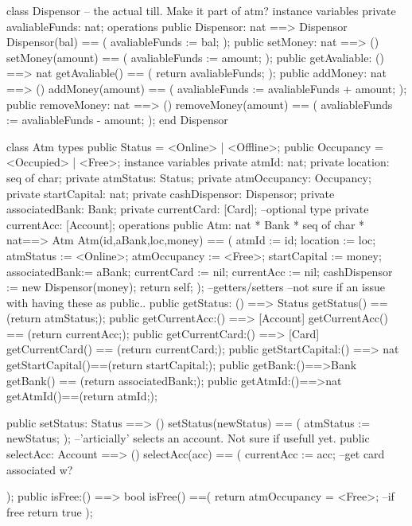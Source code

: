 \documentclass[a4paper]{article}
\begin{document}
\title{}
\author{}
\begin{vdm_al}

class Dispensor -- the actual till. Make it part of atm?
instance variables
    private avaliableFunds: nat;
operations
    public Dispensor: nat ==> Dispensor
    Dispensor(bal) == (
        avaliableFunds := bal;
    );
    public setMoney: nat ==> ()
    setMoney(amount) == (
        avaliableFunds := amount;
    ); 
    public getAvaliable: () ==> nat
    getAvaliable() == (
        return avaliableFunds;
    );
    public addMoney: nat ==> () 
    addMoney(amount) == (
        avaliableFunds := avaliableFunds + amount;
    );
    public removeMoney: nat ==> ()
    removeMoney(amount) == (
        avaliableFunds := avaliableFunds - amount;
    );
end Dispensor

class Atm
types
    public Status = <Online> | <Offline>;
    public Occupancy = <Occupied> | <Free>;
instance variables
    private atmId: nat;
    private location: seq of char;
    private atmStatus: Status;
    private atmOccupancy: Occupancy;
    private startCapital: nat;
    private cashDispensor: Dispensor;
    private associatedBank: Bank;
    private currentCard: [Card]; --optional type
    private currentAcc: [Account];
operations
    public Atm: nat * Bank * seq of char * nat==> Atm
    Atm(id,aBank,loc,money) == (
        atmId := id;
        location := loc;
        atmStatus := <Online>;
        atmOccupancy := <Free>;
        startCapital := money;
        associatedBank:= aBank;
        currentCard := nil;
        currentAcc := nil;
        cashDispensor := new Dispensor(money);
        return self;
    );
    --getters/setters
    --not sure if an issue with having these as public..
    public getStatus: () ==> Status
    getStatus() == (return atmStatus;);
    public getCurrentAcc:() ==> [Account]
    getCurrentAcc() == (return currentAcc;);
    public getCurrentCard:() ==> [Card]
    getCurrentCard() == (return currentCard;);
    public getStartCapital:() ==> nat
    getStartCapital()==(return startCapital;);
    public getBank:()==>Bank
    getBank() == (return associatedBank;);
    public getAtmId:()==>nat
    getAtmId()==(return atmId;);

    public setStatus: Status ==> ()
    setStatus(newStatus) == (
        atmStatus := newStatus;
    );
    --'articially' selects an account. Not sure if usefull yet. 
    public selectAcc: Account ==> ()
    selectAcc(acc) == (
        currentAcc := acc;
        --get card associated w?

    );
    public isFree:() ==> bool
    isFree() ==(
        return atmOccupancy = <Free>; --if free return true
    );


\end{vdm_al}
\end{document}
